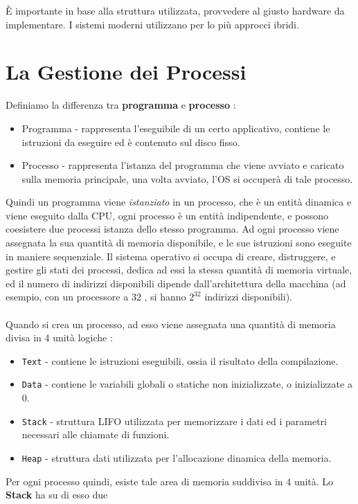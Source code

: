 \documentclass[12pt, letterpaper]{article}
\newcommand{\code}[1]{\colorbox{light-gray}{\texttt{#1}}}
\begin{document}
È importante in base alla struttura utilizzata, provvedere al giusto hardware da implementare. I sistemi 
moderni utilizzano per lo più approcci ibridi.\newpage
\section{La Gestione dei Processi}
Definiamo la differenza tra \textbf{programma} e \textbf{processo} :
\begin{itemize}
    \item Programma - rappresenta l'eseguibile di un certo applicativo, contiene le istruzioni da eseguire ed 
     è contenuto sul disco fisso. 
     \item Processo - rappresenta l'istanza del programma che viene avviato e caricato sulla memoria principale,
     una volta avviato, l'OS si occuperà di tale processo. 
\end{itemize}
Quindi un programma viene \textit{istanziato} in un processo, che è un entità dinamica e viene eseguito 
dalla CPU, ogni processo è un entità indipendente, e possono coesistere due processi istanza dello stesso
programma. Ad ogni processo viene assegnata la sua quantità di memoria disponibile, e le sue istruzioni sono 
eseguite in maniere sequenziale. Il sistema operativo si occupa di creare, distruggere, e gestire gli stati 
dei processi, dedica ad essi la stessa quantità di memoria virtuale, ed il numero di indirizzi disponibili dipende 
dall'architettura della macchina (ad esempio, con un processore a 32 , si hanno \(2^{32}\) indirizzi disponibili).
\\\hphantom{.}\\
Quando si crea un processo, ad esso viene assegnata una quantità di memoria divisa in 4 unità logiche :
\begin{itemize}
    \item \code{Text} - contiene le istruzioni eseguibili, ossia il risultato della compilazione.
    \item \code{Data} - contiene le variabili globali o statiche non inizializzate, o inizializzate a 0.
    \item \code{Stack} - struttura LIFO utilizzata per memorizzare i dati ed i parametri necessari alle chiamate di funzioni.
    \item \code{Heap} - struttura dati utilizzata per l'allocazione dinamica della memoria.
\end{itemize}
Per ogni processo quindi, esiste tale area di memoria suddivisa in 4 unità. Lo \textbf{Stack} ha su di esso due 
\end{document}
